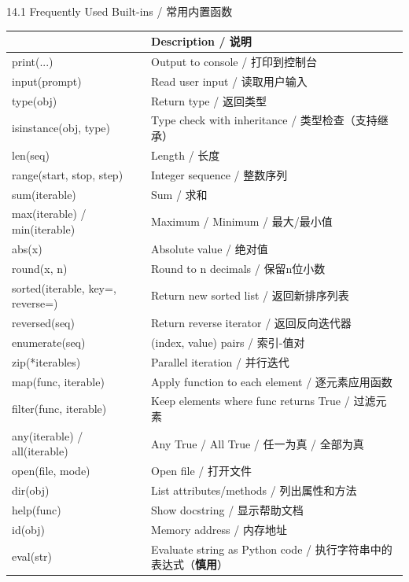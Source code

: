 \documentclass[11pt,a4paper]{report}
\begin{document}
\begin{cmdsection}{14.1  Frequently Used Built-ins / 常用内置函数}
\normalsize\renewcommand{\arraystretch}{1.4}
\centering
\begin{tabularx}{\textwidth}{@{}>{\ttfamily}l>{\raggedright\arraybackslash}X@{}}
\toprule
\multicolumn{1}{@{}l}{\textbf{Function}} & \textbf{Description / 说明} \\ \midrule
print(...)                  & Output to console / 打印到控制台 \\
input(prompt)               & Read user input / 读取用户输入 \\
type(obj)                   & Return type / 返回类型 \\
isinstance(obj, type)       & Type check with inheritance / 类型检查（支持继承） \\
len(seq)                    & Length / 长度 \\
range(start, stop, step)    & Integer sequence / 整数序列 \\
sum(iterable)               & Sum / 求和 \\
max(iterable) / min(iterable) & Maximum / Minimum / 最大/最小值 \\
abs(x)                      & Absolute value / 绝对值 \\
round(x, n)                 & Round to n decimals / 保留n位小数 \\
sorted(iterable, key=, reverse=) & Return new sorted list / 返回新排序列表 \\
reversed(seq)               & Return reverse iterator / 返回反向迭代器 \\
enumerate(seq)              & (index, value) pairs / 索引-值对 \\
zip(*iterables)             & Parallel iteration / 并行迭代 \\
map(func, iterable)         & Apply function to each element / 逐元素应用函数 \\
filter(func, iterable)      & Keep elements where func returns True / 过滤元素 \\
any(iterable) / all(iterable) & Any True / All True / 任一为真 / 全部为真 \\
open(file, mode)            & Open file / 打开文件 \\
dir(obj)                    & List attributes/methods / 列出属性和方法 \\
help(func)                  & Show docstring / 显示帮助文档 \\
id(obj)                     & Memory address / 内存地址 \\
eval(str)                    & Evaluate string as Python code / 执行字符串中的表达式（\textbf{慎用}） \\
\bottomrule
\end{tabularx}
\end{cmdsection}
\end{document}
